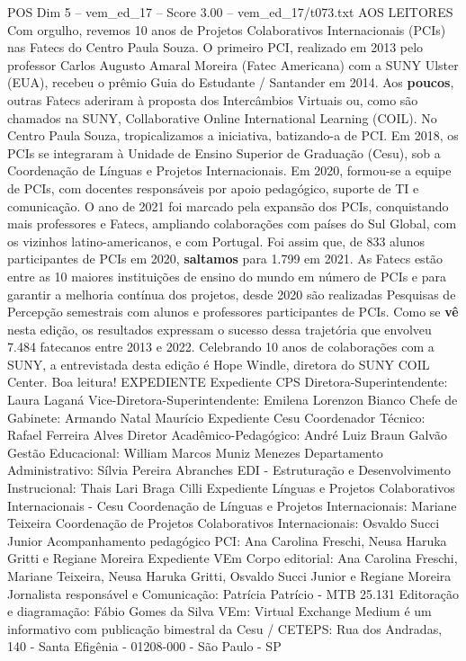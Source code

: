 \begin{textsample}{POS Dim 5 – vem\_ed\_17 – Score 3.00 – vem\_ed\_17/t073.txt}  \label{ex:f5_pos_138}
AOS LEITORES Com orgulho, revemos 10 anos de Projetos Colaborativos Internacionais (PCIs) nas Fatecs do Centro Paula Souza.
O primeiro PCI, realizado em 2013 pelo professor Carlos Augusto Amaral Moreira (Fatec Americana) com a SUNY Ulster (EUA), recebeu o prêmio Guia do Estudante / Santander em 2014.
Aos \textbf{poucos}, outras Fatecs aderiram à proposta dos Intercâmbios Virtuais ou, como são chamados na SUNY, Collaborative Online International Learning (COIL).
No Centro Paula Souza, tropicalizamos a iniciativa, batizando-a de PCI.
Em 2018, os PCIs se integraram à Unidade de Ensino Superior de Graduação (Cesu), sob a Coordenação de Línguas e Projetos Internacionais.
Em 2020, formou-se a equipe de PCIs, com docentes responsáveis por apoio pedagógico, suporte de TI e comunicação.
O ano de 2021 foi marcado pela expansão dos PCIs, conquistando mais professores e Fatecs, ampliando colaborações com países do Sul Global, com os vizinhos latino-americanos, e com Portugal.
Foi assim que, de 833 alunos participantes de PCIs em 2020, \textbf{saltamos} para 1.799 em 2021.
As Fatecs estão entre as 10 maiores instituições de ensino do mundo em número de PCIs e para garantir a melhoria contínua dos projetos, desde 2020 são realizadas Pesquisas de Percepção semestrais com alunos e professores participantes de PCIs.
Como se \textbf{vê} nesta edição, os resultados expressam o sucesso dessa trajetória que envolveu 7.484 fatecanos entre 2013 e 2022.
Celebrando 10 anos de colaborações com a SUNY, a entrevistada desta edição é Hope Windle, diretora do SUNY COIL Center.
Boa leitura!
EXPEDIENTE Expediente CPS Diretora-Superintendente: Laura Laganá Vice-Diretora-Superintendente: Emilena Lorenzon Bianco Chefe de Gabinete: Armando Natal Maurício Expediente Cesu Coordenador Técnico: Rafael Ferreira Alves Diretor Acadêmico-Pedagógico: André Luiz Braun Galvão Gestão Educacional: William Marcos Muniz Menezes Departamento Administrativo: Sílvia Pereira Abranches EDI - Estruturação e Desenvolvimento Instrucional: Thais Lari Braga Cilli Expediente Línguas e Projetos Colaborativos Internacionais - Cesu Coordenação de Línguas e Projetos Internacionais: Mariane Teixeira Coordenação de Projetos Colaborativos Internacionais: Osvaldo Succi Junior Acompanhamento pedagógico PCI: Ana Carolina Freschi, Neusa Haruka Gritti e Regiane Moreira Expediente VEm Corpo editorial: Ana Carolina Freschi, Mariane Teixeira, Neusa Haruka Gritti, Osvaldo Succi Junior e Regiane Moreira Jornalista responsável e Comunicação: Patrícia Patrício - MTB 25.131 Editoração e diagramação: Fábio Gomes da Silva VEm: Virtual Exchange Medium é um informativo com publicação bimestral da Cesu / CETEPS: Rua dos Andradas, 140 - Santa Efigênia - 01208-000 - São Paulo - SP

\end{textsample}
